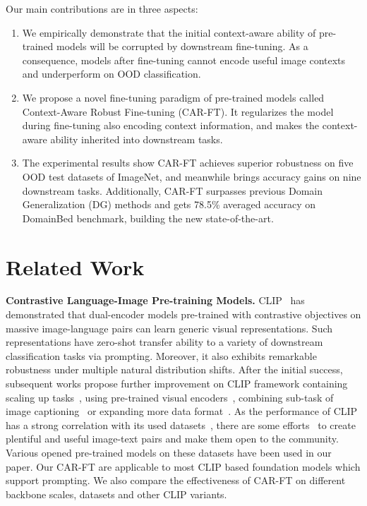 \documentclass[pdflatex,sn-basic,iicol]{sn-jnl}
\theoremstyle{thmstyleone}\newtheorem{theorem}{Theorem}\newtheorem{proposition}[theorem]{Proposition}
\theoremstyle{thmstyletwo}\newtheorem{example}{Example}\newtheorem{remark}{Remark}
\theoremstyle{thmstylethree}\newtheorem{definition}{Definition}
\begin{document}
Our main contributions are in three aspects:
\begin{enumerate}
	\item We empirically demonstrate that the initial context-aware ability of pre-trained models will be corrupted by downstream fine-tuning. As a consequence, models after fine-tuning cannot encode useful image contexts and underperform on OOD classification.
 
	\item We propose a novel fine-tuning paradigm of pre-trained models called Context-Aware Robust Fine-tuning (CAR-FT). It regularizes the model during fine-tuning also encoding context information, and makes the context-aware ability inherited into downstream tasks.
 
	\item The experimental results show CAR-FT achieves superior robustness on five OOD test datasets of ImageNet, and meanwhile brings accuracy gains on nine downstream tasks. Additionally, CAR-FT surpasses previous Domain Generalization (DG) methods and gets 78.5\% averaged accuracy on DomainBed benchmark, building the new state-of-the-art.
\end{enumerate}



\section{Related Work} \label{sec:related}

\textbf{Contrastive Language-Image Pre-training Models.} CLIP~\citep{radford2021learning} has demonstrated that dual-encoder models pre-trained with contrastive objectives on massive image-language pairs can learn generic visual representations. Such representations have zero-shot transfer ability to a variety of downstream classification tasks via prompting. Moreover, it also exhibits remarkable robustness under multiple natural distribution shifts. After the initial success, subsequent works propose further improvement on CLIP framework containing scaling up tasks~\citep{pham2021combined,jia2021scaling}, using pre-trained visual encoders~\citep{zhai2022lit}, combining sub-task of image captioning~\citep{yu2022coca} or expanding more data format~\citep{yuan2021florence}. As the performance of CLIP has a strong correlation with its used datasets~\citep{fang2022data}, there are some efforts~\citep{schuhmannlaion,thomee2016yfcc100m} to create plentiful and useful image-text pairs and make them open to the community. Various opened pre-trained models on these datasets have been used in our paper. Our CAR-FT are applicable to most CLIP based foundation models which support prompting. We also compare the effectiveness of CAR-FT on different backbone scales, datasets and other CLIP variants.  
\end{document}
